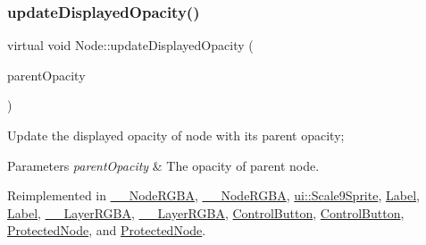 \mbox{\label{classNode_aed685e5e2976c1387525aae96f39f4f5}} 
\subsubsection{\texorpdfstring{update\+Displayed\+Opacity()}{updateDisplayedOpacity()}\hspace{0.1cm}{\footnotesize\ttfamily [2/2]}}
{\footnotesize\ttfamily virtual void Node\+::update\+Displayed\+Opacity (\begin{DoxyParamCaption}\item[{G\+Lubyte}]{parent\+Opacity }\end{DoxyParamCaption})\hspace{0.3cm}{\ttfamily [virtual]}}

Update the displayed opacity of node with it\textquotesingle{}s parent opacity; 
\begin{DoxyParams}{Parameters}
{\em parent\+Opacity} & The opacity of parent node. \\
\hline
\end{DoxyParams}


Reimplemented in \hyperlink{class____NodeRGBA_a428c41148bb3d1fe27d7eac80bb6df59}{\+\_\+\+\_\+\+Node\+R\+G\+BA}, \hyperlink{class____NodeRGBA_a428c41148bb3d1fe27d7eac80bb6df59}{\+\_\+\+\_\+\+Node\+R\+G\+BA}, \hyperlink{classui_1_1Scale9Sprite_a85bca0738c6bff049fe0a962d285bda4}{ui\+::\+Scale9\+Sprite}, \hyperlink{classLabel_a89d48e49df588b91d259cac6f8732162}{Label}, \hyperlink{classLabel_a20eff3ff123e54a021c4149a7fcf0494}{Label}, \hyperlink{class____LayerRGBA_a53e78a19fb9780fec84476f1bce1d3f6}{\+\_\+\+\_\+\+Layer\+R\+G\+BA}, \hyperlink{class____LayerRGBA_a53e78a19fb9780fec84476f1bce1d3f6}{\+\_\+\+\_\+\+Layer\+R\+G\+BA}, \hyperlink{classControlButton_a0d46b6a123c22e09c50e786b6dd5c68f}{Control\+Button}, \hyperlink{classControlButton_a51a1da3e1972b7e1d98e2318feaf498e}{Control\+Button}, \hyperlink{classProtectedNode_aef8f27d6204a82d0ed5372e9082d12ae}{Protected\+Node}, and \hyperlink{classProtectedNode_abe8e7d89709e01b0500ae8cf63991806}{Protected\+Node}.

\mbox{\label{classNode_a75318d1418261ae7e8856ba2868b5a81}} 
